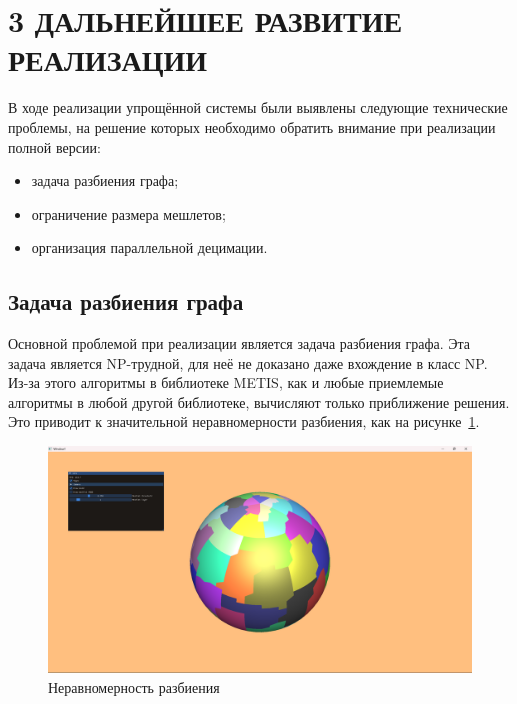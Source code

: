 \clearpage
\section{3 ДАЛЬНЕЙШЕЕ РАЗВИТИЕ РЕАЛИЗАЦИИ}
В ходе реализации упрощённой системы были выявлены следующие технические проблемы, на решение которых необходимо обратить внимание при реализации полной версии:
\begin{itemize}
    \item задача разбиения графа;
    \item ограничение размера мешлетов;
    \item организация параллельной децимации.
\end{itemize}

\subsection*{Задача разбиения графа}
Основной проблемой при реализации является задача разбиения графа.
Эта задача является NP-трудной, для неё не доказано даже вхождение в класс NP.
Из-за этого алгоритмы в библиотеке METIS, как и любые приемлемые алгоритмы в любой другой библиотеке, вычисляют только приближение решения.
Это приводит к значительной неравномерности разбиения, как на рисунке~\ref{fig:sphere-0}.
\begin{figure}[H]
    \centering
    \includegraphics[width=\textwidth]{sphere0.png}
    \caption{Неравномерность разбиения}
    \label{fig:sphere-0}
\end{figure}

